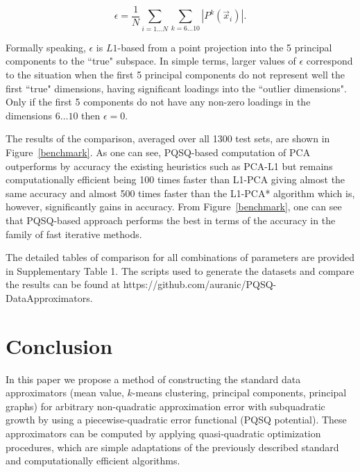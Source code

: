 \documentclass[preprint,12pt,twocolumn]{elsarticle}
\begin{document}
\begin{equation}
\epsilon = \frac{1}{N}\sum_{i=1\dots N} \sum_{k=6\dots 10} |P^k(\vec{x}_i)|.
\end{equation}

Formally speaking, $\epsilon$ is $L1$-based from a point projection into the 5 principal components to the ``true" subspace. In simple terms, larger values of $\epsilon$ correspond to the situation when the first 5 principal components do not represent well the first ``true" dimensions, having significant loadings into the ``outlier dimensions". Only if the first 5 components do not have any non-zero loadings in the dimensions $6\dots 10$ then $\epsilon=0$.

The results of the comparison, averaged over all 1300 test sets, are shown in Figure~\ref{benchmark}. As one can see, PQSQ-based computation of PCA outperforms by accuracy the existing heuristics such as PCA-L1 but remains computationally efficient being 100 times faster than L1-PCA giving almost the same accuracy and almost 500 times faster than the L1-PCA* algorithm which is, however, significantly gains in accuracy. From Figure~\ref{benchmark}, one can see that PQSQ-based approach performs the best in terms of the accuracy
in the family of fast iterative methods.

The detailed tables of comparison for all combinations of parameters are provided in Supplementary Table 1. The scripts used to generate the datasets and compare the results can be found at https://github.com/auranic/PQSQ-DataApproximators.

\section{Conclusion}

In this paper we propose a method of constructing the standard data approximators (mean value, $k$-means clustering, principal components, principal graphs)
for arbitrary non-quadratic approximation error with subquadratic growth by using a piecewise-quadratic error functional (PQSQ potential). These approximators can be computed
by applying quasi-quadratic optimization procedures, which are simple adaptations of the previously described standard and computationally efficient algorithms.
\end{document}
